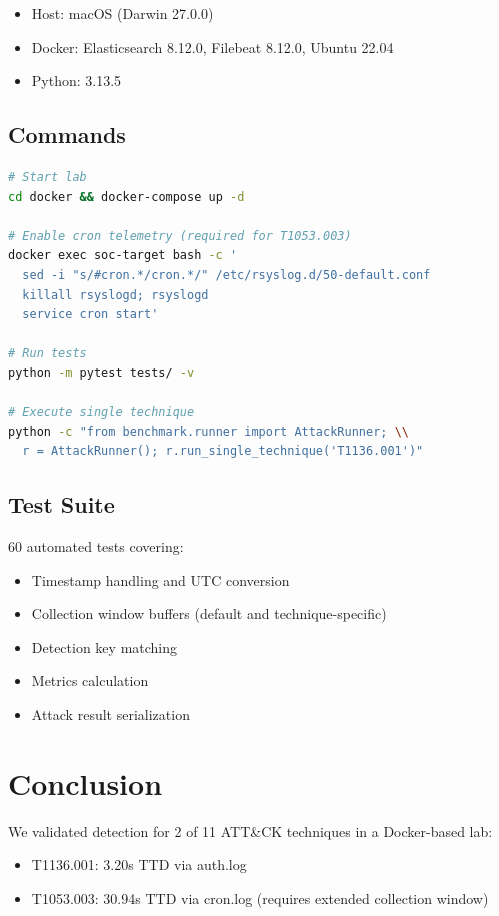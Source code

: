 \documentclass[11pt,a4paper]{article}
\begin{document}
\begin{itemize}
    \item Host: macOS (Darwin 27.0.0)
    \item Docker: Elasticsearch 8.12.0, Filebeat 8.12.0, Ubuntu 22.04
    \item Python: 3.13.5
\end{itemize}

\subsection{Commands}

\begin{lstlisting}[language=bash]
# Start lab
cd docker && docker-compose up -d

# Enable cron telemetry (required for T1053.003)
docker exec soc-target bash -c '
  sed -i "s/#cron.*/cron.*/" /etc/rsyslog.d/50-default.conf
  killall rsyslogd; rsyslogd
  service cron start'

# Run tests
python -m pytest tests/ -v

# Execute single technique
python -c "from benchmark.runner import AttackRunner; \\
  r = AttackRunner(); r.run_single_technique('T1136.001')"
\end{lstlisting}

\subsection{Test Suite}

60 automated tests covering:
\begin{itemize}
    \item Timestamp handling and UTC conversion
    \item Collection window buffers (default and technique-specific)
    \item Detection key matching
    \item Metrics calculation
    \item Attack result serialization
\end{itemize}

\section{Conclusion}

We validated detection for 2 of 11 ATT\&CK techniques in a Docker-based lab:
\begin{itemize}
    \item T1136.001: 3.20s TTD via auth.log
    \item T1053.003: 30.94s TTD via cron.log (requires extended collection window)
\end{itemize}
\end{document}
